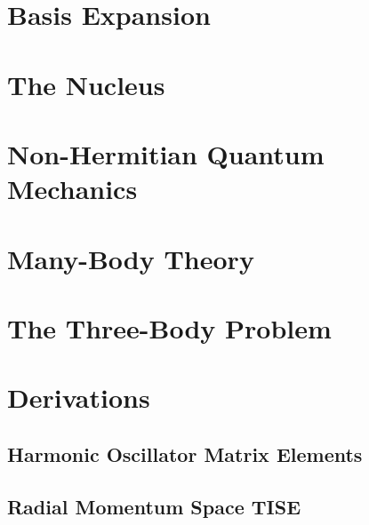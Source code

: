 \documentclass[12pt,a4paper]{report}
\begin{document}
\chapter{Basis Expansion}
\label{cha:basis expansion}


\chapter{The  Nucleus}
\label{cha:he5}


\chapter{Non-Hermitian Quantum Mechanics} 
\label{cha:nhqm}



\chapter{Many-Body Theory}
\label{cha:many-body}



\chapter{The Three-Body Problem}
\label{cha:three-body}


% 
% 
% 

\appendix

\chapter{Derivations}

\section{Harmonic Oscillator Matrix Elements}
\label{sec:HO matrix elements}



\section{Radial Momentum Space TISE}
\label{sec:radial mom space TISE}




{}
\end{document}
